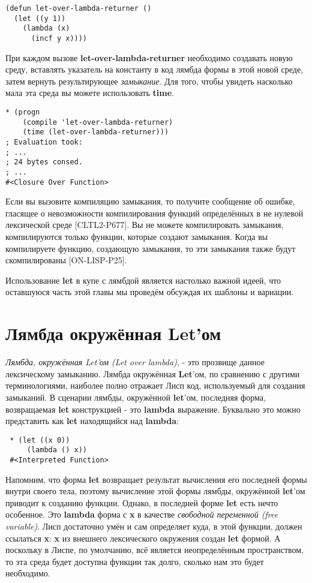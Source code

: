 \begin{verbatim}
(defun let-over-lambda-returner ()
  (let ((y 1))
    (lambda (x)
      (incf y x))))
\end{verbatim}

При каждом вызове \textbf{let-over-lambda-returner} необходимо создавать новую среду, вставлять указатель на константу в код лямбда формы в этой новой среде, затем вернуть результирующее \emph{замыкание}. Для того, чтобы увидеть насколько мала эта среда вы можете использовать \textbf{time}.

\begin{verbatim}
* (progn
    (compile 'let-over-lambda-returner)
    (time (let-over-lambda-returner)))
; Evaluation took:
; ...
; 24 bytes consed.
; ...
#<Closure Over Function>
\end{verbatim}

Если вы вызовите компиляцию замыкания, то получите сообщение об ошибке, гласящее о невозможности компилирования функций определённых в не нулевой лексической среде [CLTL2-P677]. Вы не можете компилировать замыкания, компилируются только функции, которые создают замыкания. Когда вы компилируете функцию, создающую замыкания, то эти замыкания также будут скомпилированы [ON-LISP-P25].

Использование \textbf{let} в купе с лямбдой является настолько важной идеей, что оставшуюся часть этой главы мы проведём обсуждая их шаблоны и вариации.

\section{Лямбда окружённая Let'ом}\label{section_let_over_lambda}

\emph{Лямбда, окружённая Let'ом (Let over lambda)}, - это прозвище данное лексическому замыканию. Лямбда окружённая \textbf{Let}'ом, по сравнению с другими терминологиями, наиболее полно отражает Лисп код, используемый для создания замыканий. В сценарии лямбды, окружённой \textbf{let}'ом, последняя форма, возвращаемая \textbf{let} конструкцией - это \textbf{lambda} выражение. Буквально это можно представить как \textbf{let} находящийся над \textbf{lambda}:

\begin{verbatim}
 * (let ((x 0))
     (lambda () x))
 #<Interpreted Function>
\end{verbatim}

Напомним, что форма \textbf{let} возвращает результат вычисления его последней формы внутри своего тела, поэтому вычисление этой формы лямбды, окружённой \textbf{let}'ом приводит к созданию функции. Однако, в последней форме \textbf{let} есть нечто особенное. Это \textbf{lambda} форма с \textbf{x} в качестве \emph{свободной переменной (free variable)}. Лисп достаточно умён и сам определяет куда, в этой функции, должен ссылаться \textbf{x}: \textbf{x} из внешнего лексического окружения создан \textbf{let} формой. А поскольку в Лиспе, по умолчанию, всё является неопределённым пространством, то эта среда будет доступна функции так долго, сколько нам это будет необходимо.

